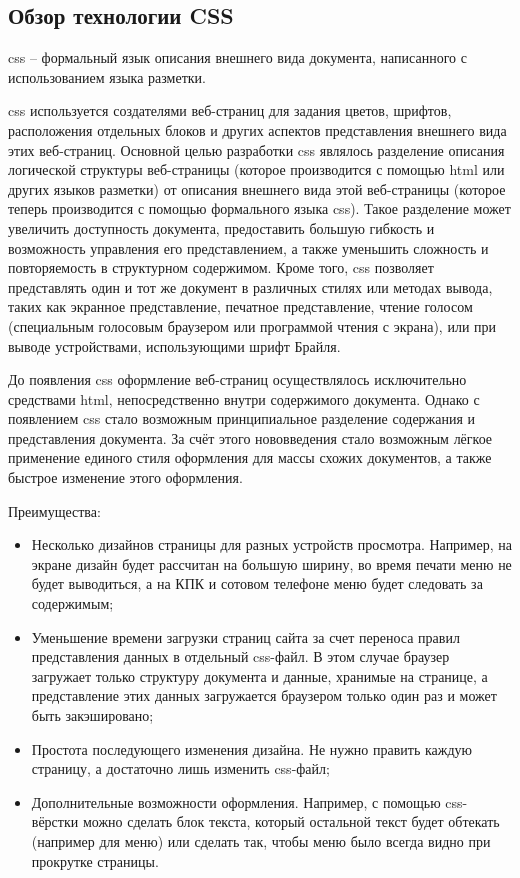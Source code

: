 \subsection{Обзор технологии CSS}

\gls{css} -- формальный язык описания внешнего вида документа, написанного с использованием языка разметки.

\gls{css} используется создателями веб-страниц для задания цветов, шрифтов, расположения отдельных блоков и других аспектов представления внешнего вида этих веб-страниц. Основной целью разработки \gls{css} являлось разделение описания логической структуры веб-страницы (которое производится с помощью \gls{html} или других языков разметки) от описания внешнего вида этой веб-страницы (которое теперь производится с помощью формального языка \gls{css}). Такое разделение может увеличить доступность документа, предоставить большую гибкость и возможность управления его представлением, а также уменьшить сложность и повторяемость в структурном содержимом. Кроме того, \gls{css} позволяет представлять один и тот же документ в различных стилях или методах вывода, таких как экранное представление, печатное представление, чтение голосом (специальным голосовым браузером или программой чтения с экрана), или при выводе устройствами, использующими шрифт Брайля\cite{wiki:CSS}.

До появления \gls{css} оформление веб-страниц осуществлялось исключительно средствами \gls{html}, непосредственно внутри содержимого документа. Однако с появлением \gls{css} стало возможным принципиальное разделение содержания и представления документа. За счёт этого нововведения стало возможным лёгкое применение единого стиля оформления для массы схожих документов, а также быстрое изменение этого оформления.

Преимущества:
\begin{itemize}
	\item Несколько дизайнов страницы для разных устройств просмотра. Например, на экране дизайн будет рассчитан на большую ширину, во время печати меню не будет выводиться, а на КПК и сотовом телефоне меню будет следовать за содержимым;
	\item Уменьшение времени загрузки страниц сайта за счет переноса правил представления данных в отдельный \gls{css}-файл. В этом случае браузер загружает только структуру документа и данные, хранимые на странице, а представление этих данных загружается браузером только один раз и может быть закэшировано;
	\item Простота последующего изменения дизайна. Не нужно править каждую страницу, а достаточно лишь изменить \gls{css}-файл;
	\item Дополнительные возможности оформления. Например, с помощью \gls{css}-вёрстки можно сделать блок текста, который остальной текст будет обтекать (например для меню) или сделать так, чтобы меню было всегда видно при прокрутке страницы.
\end{itemize}

